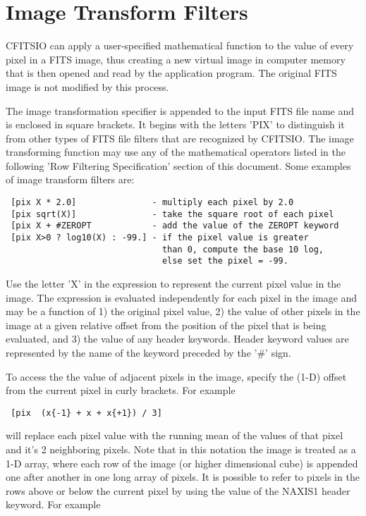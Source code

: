 \documentclass[11pt]{book}
\begin{document}
\section{Image Transform Filters}

CFITSIO can apply a user-specified mathematical function to the value
of every pixel in a FITS image, thus creating a new virtual image
in computer memory that is then opened and read by the application
program.  The original FITS image is not modified by this process.

The image transformation specifier is appended to the input
FITS file name and is enclosed in square brackets.  It begins with the
letters 'PIX' to distinguish it from other types of FITS file filters
that are recognized by CFITSIO.  The image transforming function may
use any of the mathematical operators listed in the following
'Row Filtering Specification' section of this document.
Some examples of  image transform filters are:

\begin{verbatim}
 [pix X * 2.0]               - multiply each pixel by 2.0
 [pix sqrt(X)]               - take the square root of each pixel
 [pix X + #ZEROPT            - add the value of the ZEROPT keyword
 [pix X>0 ? log10(X) : -99.] - if the pixel value is greater
                               than 0, compute the base 10 log,
                               else set the pixel = -99.
\end{verbatim}
Use the letter 'X' in the expression to represent the current pixel value
in the image.  The expression is evaluated
independently for each pixel in the image and may be a function of 1) the
original pixel value, 2) the value of other pixels in the image at
a given relative offset from the position of the pixel that is being
evaluated, and 3) the value of
any header keywords.  Header keyword values are represented
by the name of the keyword preceded by the '\#' sign.


To access the the value of adjacent pixels in the image,
specify the (1-D) offset from the current pixel in curly brackets.
For example

\begin{verbatim}
 [pix  (x{-1} + x + x{+1}) / 3]
\end{verbatim}
will replace each pixel value with the running mean of the values of that
pixel and it's 2 neighboring pixels.  Note that in this notation the image
is treated as a 1-D array, where each row of the image (or higher dimensional
cube) is appended one after another in one long array of pixels.
It is possible to refer to pixels
in the rows above or below the current pixel by using the value of the
NAXIS1 header keyword.  For example
\end{document}
